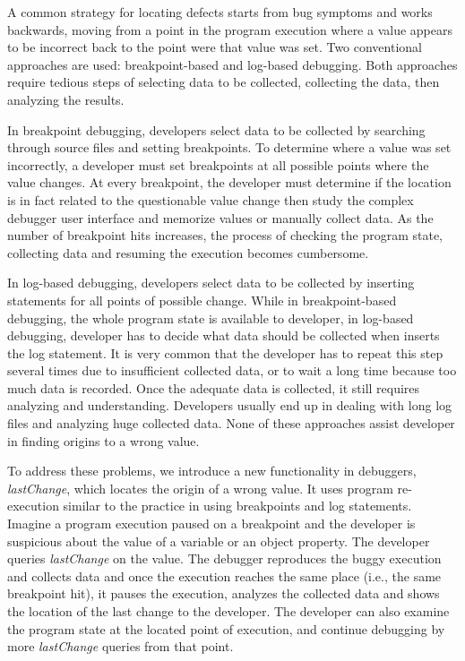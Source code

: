 \documentclass[runningheads,a4paper]{llncs}
\begin{document}
A common strategy for locating defects starts from bug symptoms and
works backwards, moving from a point in the program execution where a
value appears to be incorrect back to the point were that value was
set.  Two conventional approaches are used: breakpoint-based and
log-based debugging. Both approaches require tedious steps of
selecting data to be collected, collecting the data, then analyzing
the results. 

In breakpoint debugging, developers select data to be collected by
searching through source files and setting breakpoints. To determine
where a value was set incorrectly, a developer must set
breakpoints at all possible points where the value changes. At
every breakpoint, the developer must determine if the location is in
fact related to the questionable value change then study the complex
debugger user interface and memorize values or manually collect
data. As the number of breakpoint hits increases, the process of
checking the program state, collecting data and resuming the execution
becomes cumbersome.

In log-based debugging, developers select data to be collected by
inserting statements for all points of possible change.  While in
breakpoint-based debugging, the whole program state is available to
developer, in log-based debugging, developer has to decide what data
should be collected when inserts the log statement. It is very common
that the developer has to repeat this step several times due to
insufficient collected data, or to wait a long time because too much
data is recorded. Once the adequate data is collected, it still
requires analyzing and understanding. Developers usually end up in
dealing with long log files and analyzing huge collected data.  None
of these approaches assist developer in finding origins to a wrong
value.

To address these problems, we introduce a new functionality in
debuggers, \textit{lastChange}, which locates the origin of a wrong
value. It uses program re-execution similar to the practice
in using breakpoints and log statements. Imagine a program execution 
paused on a breakpoint and the developer is
suspicious about the value of a variable or an object property. The
developer queries \textit{lastChange} on the value. The debugger
reproduces the buggy execution and collects data
and once the execution reaches the same place (i.e., the same
breakpoint hit), it pauses the execution, analyzes the collected data
and shows the location of the last change to the developer. The
developer can also examine the program state at the located point of
execution, and continue debugging by more \textit{lastChange} queries
from that point.
\end{document}
